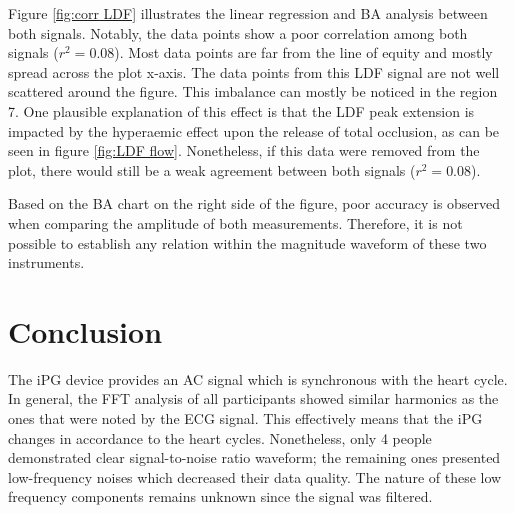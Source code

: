Figure \ref{fig:corr LDF} illustrates the linear regression and BA analysis between both signals. Notably, the data points show a poor correlation among both signals ($r^2 = 0.08$). Most data points are far from the line of equity and mostly spread across the plot x-axis. The data points from this LDF signal are not well scattered around the figure. This imbalance can mostly be noticed in the region 7.  One plausible explanation of this effect is that the LDF peak extension is impacted by the hyperaemic effect upon the release of total occlusion, as can be seen in figure \ref{fig:LDF flow}. Nonetheless, if this data were removed from the plot, there would still be a weak agreement between both signals ($r^2 = 0.08$).

Based on the BA chart on the right side of the figure, poor accuracy is observed when comparing the amplitude of both measurements. Therefore, it is not possible to establish any relation within the magnitude waveform of these two instruments.



\section{Conclusion}  %
\label{section correlation 5}
The iPG device provides an AC signal which is synchronous with the heart cycle. In general, the FFT analysis of all participants showed similar harmonics as the ones that were noted by the ECG signal. This effectively means that the iPG changes in accordance to the heart cycles. Nonetheless, only 4 people demonstrated clear signal-to-noise ratio waveform; the remaining ones presented low-frequency noises which decreased their data quality. The nature of these low frequency components remains unknown since the signal was filtered.

